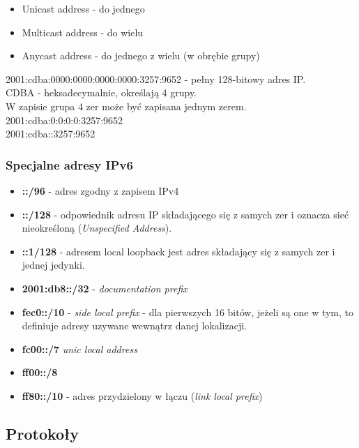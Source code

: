 \documentclass[a4paper,twoside]{article}
\begin{document}
\begin{itemize}
	\item Unicast address - do jednego
	\item Multicast address - do wielu
	\item Anycast address - do jednego z wielu (w obrębie grupy)
\end{itemize}

2001:cdba:0000:0000:0000:0000:3257:9652 - pełny 128-bitowy adres IP.\\
CDBA - heksadecymalnie, określają 4 grupy.\\
W zapisie grupa 4 zer może być zapisana jednym zerem.\\
2001:cdba:0:0:0:0:3257:9652\\
2001:cdba::3257:9652

\subsubsection{Specjalne adresy IPv6}
\begin{itemize}
	\item \textbf{::/96} - adres zgodny z zapisem IPv4
	\item \textbf{::/128} - odpowiednik adresu IP składającego się z samych zer i oznacza sieć nieokreśloną (\emph{Unspecified Address}).
	\item \textbf{::1/128} - adresem local loopback jest adres składający się z samych zer i jednej jedynki.
	\item \textbf{2001:db8::/32} - \emph{documentation prefix}
	\item \textbf{fec0::/10} - \emph{side local prefix} - dla pierwszych 16 bitów, jeżeli są one w tym, to definiuje adresy uzywane wewnątrz danej lokalizacji.
	\item \textbf{fc00::/7} \emph{unic local address}
	\item \textbf{ff00::/8}
	\item \textbf{ff80::/10} - adres przydzielony w łączu (\emph{link local prefix})
\end{itemize}

\subsection{Protokoły}
\end{document}
